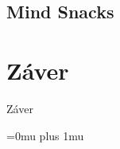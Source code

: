 \documentclass[10pt,twoside,slovak,a4paper]{article}
\begin{document}
\subsection{Mind Snacks}

\section{Záver} \label{zaver} %
Záver



\Urlmuskip=0mu plus 1mu
\def\UrlBreaks{\do\/\do-}


\end{document}

